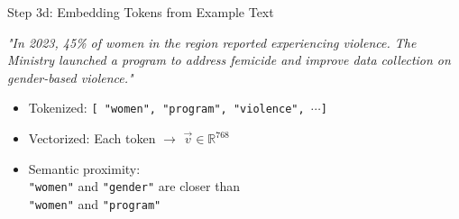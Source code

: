 \documentclass[xcolor=x11names,  aspectratio=169, compress]{beamer}
\renewcommand{\(}{\begin{columns}}
\renewcommand{\)}{\end{columns}}
\newcommand{\<}[1]{\begin{column}{#1}}
\renewcommand{\>}{\end{column}}
\begin{document}
\begin{frame}{Step 3d: Embedding Tokens from Example Text}

\emph{"In 2023, 45\% of women in the region reported experiencing violence. 
The Ministry launched a program to address femicide and improve data collection on gender-based violence."} \\
\vspace{0.5cm}

\begin{itemize}
    \item Tokenized: \texttt{[ "women", "program", "violence", $\cdots$]}
    \item Vectorized: Each token $\rightarrow$ $\vec{v} \in \mathbb{R}^{768}$ 
    \item Semantic proximity: \\
    \texttt{"women"} and \texttt{"gender"} are closer than\\ \texttt{"women"} and \texttt{"program"}
\end{itemize}

\begin{center}
\end{center}

\end{frame}
\end{document}
